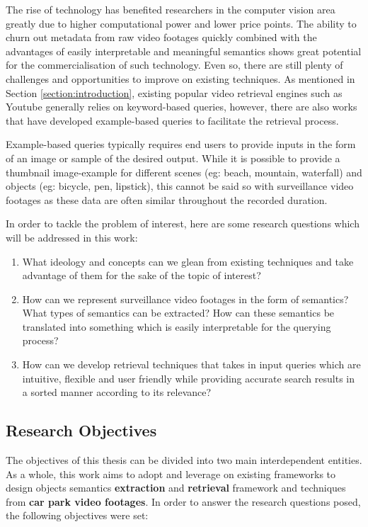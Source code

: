 The rise of technology has benefited researchers in the computer vision area greatly due to higher computational power and lower price points. The ability to churn out metadata from raw video footages quickly combined with the advantages of easily interpretable and meaningful semantics shows great potential for the commercialisation of such technology. Even so, there are still plenty of challenges and opportunities to improve on existing techniques. As mentioned in Section \ref{section:introduction}, existing popular video retrieval engines such as Youtube generally relies on keyword-based queries, however, there are also works that have developed example-based queries \cite{zhang2017car, liu2016large, castanon2016retrieval} to facilitate the retrieval process.

Example-based queries typically requires end users to provide inputs in the form of an image or sample of the desired output. While it is possible to provide a thumbnail image-example for different scenes (eg: beach, mountain, waterfall) and objects (eg: bicycle, pen, lipstick), this cannot be said so with surveillance video footages as these data are often similar throughout the recorded duration.

In order to tackle the problem of interest, here are some research questions which will be addressed in this work:
\begin{enumerate}
\item What ideology and concepts can we glean from existing techniques and take advantage of them for the sake of the topic of interest?
\item How can we represent surveillance video footages in the form of semantics? What types of semantics can be extracted? How can these semantics be translated into something which is easily interpretable for the querying process?
\item How can we develop retrieval techniques that takes in input queries which are intuitive, flexible and user friendly while providing accurate search results in a sorted manner according to its relevance?
\end{enumerate}



\subsection{Research Objectives}
The objectives of this thesis can be divided into two main interdependent entities. As a whole, this work aims to adopt and leverage on existing frameworks to design objects semantics \textbf{extraction} and \textbf{retrieval} framework and techniques from \textbf{car park video footages}. In order to answer the research questions posed, the following objectives were set:

